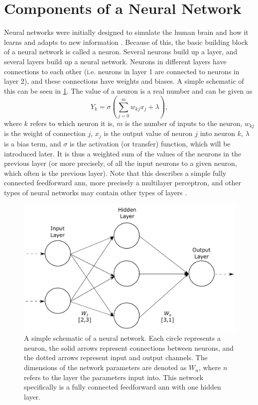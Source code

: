 \section{Components of a Neural Network}
\label{sec:ml:componentsofaneuralnetwork}
Neural networks were initially designed to simulate the human brain and how it learns and adapts to new information \cite{McCulloch1943}. Because of this, the basic building block of a neural network is called a neuron. Several neurons build up a layer, and several layers build up a neural network. Neurons in different layers have connections to each other (i.e. neurons in layer 1 are connected to neurons in layer 2), and these connections have weights and biases. A simple schematic of this can be seen in \cref{fig:neuralnetwork}. The value of a neuron is a real number and can be given as \cite[81]{Wang2003}
\begin{equation}
    \label{eq:neuron}
    Y_{k} = \sigma\left(\sum_{j=0}^{m}w_{kj}x_j + \lambda \right),
\end{equation}
where $k$ refers to which neuron it is, $m$ is the number of inputs to the neuron, $w_{kj}$ is the weight of connection $j$, $x_j$ is the output value of neuron $j$ into neuron $k$, $\lambda$ is a bias term, and $\sigma$ is the activation (or transfer) function, which will be introduced later. It is thus a weighted sum of the values of the neurons in the previous layer (or more precisely, of all the input neurons to a given neuron, which often is the previous layer). Note that this describes a simple fully connected feedforward \gls{ann}, more precisely a multilayer perceptron, and other types of neural networks may contain other types of layers \cite{oshea2015introduction}. 

\begin{figure}[htbp]  
    \centering
    \includegraphics[width=.8\textwidth]{figures/neuralnetwork.pdf}
    \caption[Neural network example]{A simple schematic of a neural network. Each circle represents a neuron, the solid arrows represent connections between neurons, and the dotted arrows represent input and output channels. The dimensions of the network parameters are denoted as $W_n$, where $n$ refers to the layer the parameters input into. This network specifically is a fully connected feedforward \acrlong{ann} with one hidden layer. }
    \label{fig:neuralnetwork}
\end{figure}

